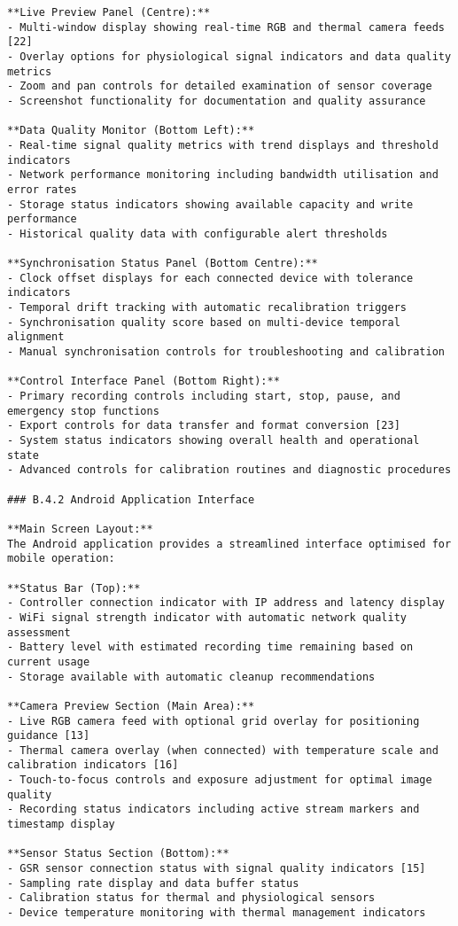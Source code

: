 \begin{verbatim}
**Live Preview Panel (Centre):**
- Multi-window display showing real-time RGB and thermal camera feeds [22]
- Overlay options for physiological signal indicators and data quality metrics
- Zoom and pan controls for detailed examination of sensor coverage
- Screenshot functionality for documentation and quality assurance

**Data Quality Monitor (Bottom Left):**
- Real-time signal quality metrics with trend displays and threshold indicators
- Network performance monitoring including bandwidth utilisation and error rates
- Storage status indicators showing available capacity and write performance
- Historical quality data with configurable alert thresholds

**Synchronisation Status Panel (Bottom Centre):**
- Clock offset displays for each connected device with tolerance indicators
- Temporal drift tracking with automatic recalibration triggers
- Synchronisation quality score based on multi-device temporal alignment
- Manual synchronisation controls for troubleshooting and calibration

**Control Interface Panel (Bottom Right):**
- Primary recording controls including start, stop, pause, and emergency stop functions
- Export controls for data transfer and format conversion [23]
- System status indicators showing overall health and operational state
- Advanced controls for calibration routines and diagnostic procedures

### B.4.2 Android Application Interface

**Main Screen Layout:**
The Android application provides a streamlined interface optimised for mobile operation:

**Status Bar (Top):**
- Controller connection indicator with IP address and latency display
- WiFi signal strength indicator with automatic network quality assessment
- Battery level with estimated recording time remaining based on current usage
- Storage available with automatic cleanup recommendations

**Camera Preview Section (Main Area):**
- Live RGB camera feed with optional grid overlay for positioning guidance [13]
- Thermal camera overlay (when connected) with temperature scale and calibration indicators [16]
- Touch-to-focus controls and exposure adjustment for optimal image quality
- Recording status indicators including active stream markers and timestamp display

**Sensor Status Section (Bottom):**
- GSR sensor connection status with signal quality indicators [15]
- Sampling rate display and data buffer status
- Calibration status for thermal and physiological sensors
- Device temperature monitoring with thermal management indicators


\end{verbatim}
